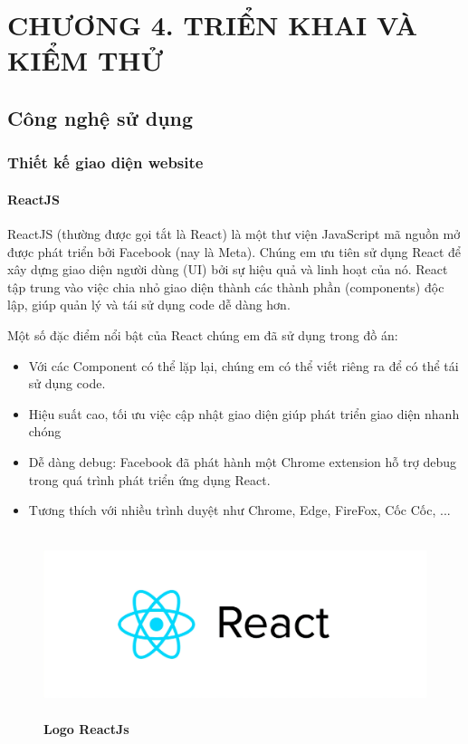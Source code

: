
\section*{CHƯƠNG 4. TRIỂN KHAI VÀ KIỂM THỬ}
\setcounter{section}{4}
\setcounter{subsection}{0} %
\setcounter{table}{0} %
\setcounter{figure}{0} %

\subsection{Công nghệ sử dụng}
\subsubsection{Thiết kế giao diện website}
\paragraph{ReactJS}
\mbox{}

ReactJS (thường được gọi tắt là React) là một thư viện JavaScript mã nguồn mở được phát triển bởi Facebook (nay là Meta). Chúng em ưu tiên sử dụng React để xây dựng giao diện người dùng (UI) bởi sự hiệu quả và linh hoạt của nó. React tập trung vào việc chia nhỏ giao diện thành các thành phần (components) độc lập, giúp quản lý và tái sử dụng code dễ dàng hơn.

Một số đặc điểm nổi bật của React chúng em đã sử dụng trong đồ án:
\begin{itemize}
  \item Với các Component có thể lặp lại, chúng em có thể viết riêng ra để có thể tái sử dụng code.
  \item Hiệu suất cao, tối ưu việc cập nhật giao diện giúp phát triển giao diện nhanh chóng
  \item Dễ dàng debug: Facebook đã phát hành một Chrome extension hỗ trợ debug trong quá trình phát triển ứng dụng React.
  \item Tương thích với nhiều trình duyệt như Chrome, Edge, FireFox, Cốc Cốc, ...
\end{itemize}

\begin{figure}[H]
  \centering
  \includegraphics[width=15cm,height=5.4cm]{Images/Technology/react_logo.png}
  \caption[Logo ReactJs]{\bfseries \fontsize{12pt}{0pt}
  \selectfont Logo ReactJs}
  \label{reactjs_cover} %
\end{figure}


